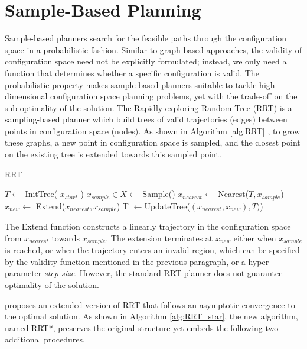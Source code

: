\documentclass[../thesis.tex]{subfiles}
\begin{document}
 
 
\section{Sample-Based Planning}
\label{sec:sample_based_planning}
 
Sample-based planners search for the feasible paths through the configuration space in a probabilistic fashion.
Similar to graph-based approaches, the validity of configuration space need not be explicitly formulated; instead, we only need a function that determines whether a specific configuration is valid.
The probabilistic property makes sample-based planners suitable to tackle high dimensional configuration space planning problems, yet with the trade-off on the sub-optimality of the solution.
The Rapidly-exploring Random Tree (RRT) is a sampling-based planner which build trees of valid trajectories (edges) between points in configuration space (nodes).
As shown in Algorithm \ref{alg:RRT} \cite{lavalle1998rapidly}, to grow these graphs, a new point in configuration space is sampled, and the closest point on the existing tree is extended towards this sampled point.
 
\begin{algorithm}
  \caption{RRT} \label{alg:RRT}
  \begin{algorithmic}[1]
  \State $T \leftarrow$ InitTree( $x_{start}$ )
        \State $x_{sample} \in X \leftarrow$ Sample()
        \State $x_{nearest} \leftarrow $ Nearest($T, x_{sample}$)
        \State $x_{new} \leftarrow $ Extend($x_{nearest}, x_{sample}$)
        \State T $\leftarrow $UpdateTree($(x_{nearest},x_{new}), T)$)
  \EndWhile
  \end{algorithmic}
\end{algorithm}
 
The Extend function constructs a linearly trajectory in the configuration space from $x_{nearest}$ towards $x_{sample}$.
The extension terminates at $x_{new}$ either when $x_{sample}$ is reached, or when the trajectory enters an invalid region, which can be specified by the validity function mentioned in the previous paragraph, or a hyper-parameter \textit{step size}.
However, the standard RRT planner does not guarantee optimality of the solution.
 
\citet{karaman2011sampling} proposes an extended version of RRT that follows an asymptotic convergence to the optimal solution.
As shown in Algorithm \ref{alg:RRT_star}, the new algorithm, named RRT*, preserves the original structure yet embeds the following two additional procedures.
 
\end{document}
